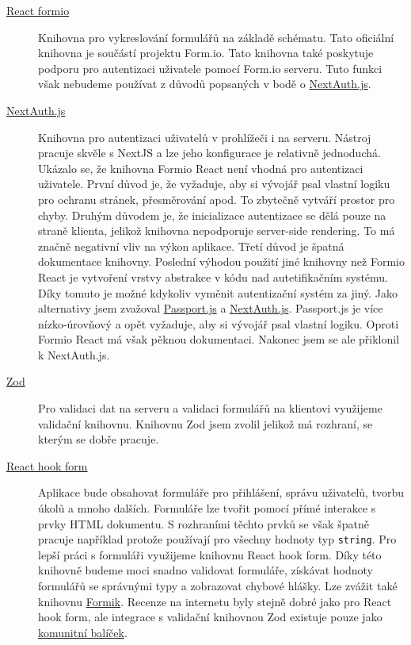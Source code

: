 \begin{description}
    \item[\href{https://github.com/formio/react}{React formio}]
    Knihovna pro vykreslování formulářů na základě schématu.
    Tato oficiální knihovna je součástí projektu Form.io.
    Tato knihovna také poskytuje podporu pro autentizaci uživatele pomocí Form.io serveru.
    Tuto funkci však nebudeme používat z důvodů popsaných v bodě o \href{itm:next-auth}{NextAuth.js}.
    \item[\href{https://next-auth.js.org/}{NextAuth.js}]\label{itm:next-auth}
    Knihovna pro autentizaci uživatelů v prohlížeči i na serveru.
    Nástroj pracuje skvěle s NextJS a lze jeho konfigurace je relativně jednoduchá.
    Ukázalo se, že knihovna Formio React není vhodná pro autentizaci uživatele.
    První důvod je, že vyžaduje, aby si vývojář psal vlastní logiku pro ochranu stránek, přesměrování apod.
    To zbytečně vytváří prostor pro chyby.
    Druhým důvodem je, že inicializace autentizace se dělá pouze na straně klienta, jelikož knihovna nepodporuje server-side rendering.
    To má značně negativní vliv na výkon aplikace.
    Třetí důvod je špatná dokumentace knihovny.
    Poslední výhodou použití jiné knihovny než Formio React je vytvoření vrstvy abstrakce v kódu nad autetifikačním systému.
    Díky tomuto je možné kdykoliv vyměnit autentizační systém za jiný.
    Jako alternativy jsem zvažoval \href{https://www.passportjs.org/}{Passport.js} a \href{https://next-auth.js.org/}{NextAuth.js}.
    Passport.js je více nízko-úrovňový a opět vyžaduje, aby si vývojář psal vlastní logiku.
    Oproti Formio React má však pěknou dokumentaci.
    Nakonec jsem se ale přiklonil k NextAuth.js.
    \item[\href{https://zod.dev/}{Zod}]
    Pro validaci dat na serveru a validaci formulářů na klientovi využijeme validační knihovnu.
    Knihovnu Zod jsem zvolil jelikož má rozhraní, se kterým se dobře pracuje.
    \item[\href{https://react-hook-form.com/}{React hook form}]
    Aplikace bude obsahovat formuláře pro přihlášení, správu uživatelů, tvorbu úkolů a mnoho dalších.
    Formuláře lze tvořit pomocí přímé interakce s prvky HTML dokumentu.
    S rozhraními těchto prvků se však špatně pracuje například protože používají pro všechny hodnoty typ \texttt{string}.
    Pro lepší práci s formuláři využijeme knihovnu React hook form.
    Díky této knihovně budeme moci snadno validovat formuláře, získávat hodnoty formulářů se správnými typy a zobrazovat chybové hlášky.
    Lze zvážit také knihovnu \href{https://formik.org}{Formik}.
    Recenze na internetu byly stejně dobré jako pro React hook form, ale integrace s validační knihovnou Zod existuje pouze jako \href{https://github.com/robertLichtnow/zod-formik-adapter}{komunitní balíček}.

\end{description}
